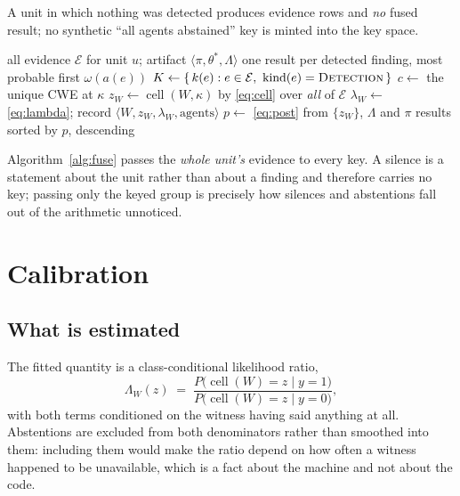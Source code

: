 \documentclass[conference]{IEEEtran}
\newcommand{\Unit}{u}
\newcommand{\Ev}{\mathcal{E}}
\newcommand{\Wit}{\mathcal{W}}
\newcommand{\LR}{\Lambda}
\newcommand{\cellop}{\operatorname{cell}}
\begin{document}
A unit in which nothing was detected produces evidence rows and \emph{no} fused result; no
synthetic ``all agents abstained'' key is minted into the key space.

\begin{algorithm}[t]
\caption{\textsc{Fuse}$(\Unit, \Ev)$}
\label{alg:fuse}
\begin{algorithmic}[1]
\Require all evidence $\Ev$ for unit $\Unit$; artifact $\langle \pi, \theta^{*}, \LR \rangle$
\Ensure one result per detected finding, most probable first
\ForAll{$e \in \Ev$} \State $\omega(a(e))$  \EndFor
\State $K \gets \{\,k(e) : e \in \Ev,\ \mathrm{kind}(e)=\textsc{Detection}\,\}$
  \State $c \gets$ the unique CWE at $\kappa$
  \ForAll{$W \in \Wit$}
    \State $z_W \gets \cellop(W,\kappa)$ by \eqref{eq:cell} over \emph{all} of $\Ev$
    \State $\lambda_W \gets$ \eqref{eq:lambda}; record $\langle W, z_W, \lambda_W, \text{agents} \rangle$
  \EndFor
  \State $p \gets$ \eqref{eq:post} from $\{z_W\}$, $\LR$ and $\pi$
\EndFor
\State \Return results sorted by $p$, descending
\end{algorithmic}
\end{algorithm}

Algorithm~\ref{alg:fuse} passes the \emph{whole unit's} evidence to every key. A silence is a
statement about the unit rather than about a finding and therefore carries no key; passing
only the keyed group is precisely how silences and abstentions fall out of the arithmetic
unnoticed.

\section{Calibration}

\subsection{What is estimated}
The fitted quantity is a class-conditional likelihood ratio,
\begin{equation}
\LR_W(z) \;=\; \frac{P\bigl(\cellop(W)=z \mid y=1\bigr)}{P\bigl(\cellop(W)=z \mid y=0\bigr)},
\label{eq:lr}
\end{equation}
with both terms conditioned on the witness having said anything at all. Abstentions are
excluded from both denominators rather than smoothed into them: including them would make the
ratio depend on how often a witness happened to be unavailable, which is a fact about the
machine and not about the code.
\end{document}
